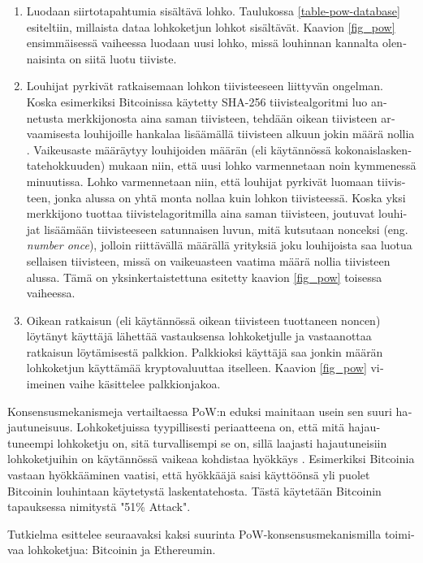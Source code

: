 \begin{otherlanguage}{english}
\begin{enumerate}
\item Luodaan siirtotapahtumia sisältävä lohko. Taulukossa \ref{table-pow-database} esiteltiin, millaista dataa lohkoketjun lohkot sisältävät. Kaavion \ref{fig_pow} ensimmäisessä vaiheessa luodaan uusi lohko, missä louhinnan kannalta olennaisinta on siitä luotu tiiviste.
\item Louhijat pyrkivät ratkaisemaan lohkon tiivisteeseen liittyvän ongelman. Koska esimerkiksi Bitcoinissa käytetty SHA-256 tiivistealgoritmi luo annetusta merkkijonosta aina saman tiivisteen, tehdään oikean tiivisteen arvaamisesta louhijoille hankalaa lisäämällä tiivisteen alkuun jokin määrä nollia \cite{blockchain1}. Vaikeusaste määräytyy louhijoiden määrän (eli käytännössä kokonaislaskentatehokkuuden) mukaan niin, että uusi lohko varmennetaan noin kymmenessä minuutissa. Lohko varmennetaan niin, että louhijat pyrkivät luomaan tiivisteen, jonka alussa on yhtä monta nollaa kuin lohkon tiivisteessä. Koska yksi merkkijono tuottaa tiivistelagoritmilla aina saman tiivisteen, joutuvat louhijat lisäämään tiivisteeseen satunnaisen luvun, mitä kutsutaan nonceksi (eng. \textit{number once}), jolloin riittävällä määrällä yrityksiä joku louhijoista saa luotua sellaisen tiivisteen, missä on vaikeuasteen vaatima määrä nollia tiivisteen alussa. Tämä on yksinkertaistettuna esitetty kaavion \ref{fig_pow} toisessa vaiheessa.
\item Oikean ratkaisun (eli käytännössä oikean tiivisteen tuottaneen noncen) löytänyt käyttäjä lähettää vastauksensa lohkoketjulle ja vastaanottaa ratkaisun löytämisestä palkkion. Palkkioksi käyttäjä saa jonkin määrän lohkoketjun käyttämää kryptovaluuttaa itselleen. Kaavion \ref{fig_pow} viimeinen vaihe käsittelee palkkionjakoa.
\end{enumerate}

Konsensusmekanismeja vertailtaessa PoW:n eduksi mainitaan usein sen suuri hajautuneisuus. Lohkoketjuissa tyypillisesti periaatteena on, että mitä hajautuneempi lohkoketju on, sitä turvallisempi se on, sillä laajasti hajautuneisiin lohkoketjuihin on käytännössä vaikeaa kohdistaa hyökkäys \cite{51attack}. Esimerkiksi Bitcoinia vastaan hyökkääminen vaatisi, että hyökkääjä saisi käyttöönsä yli puolet Bitcoinin louhintaan käytetystä laskentatehosta. Tästä käytetään Bitcoinin tapauksessa nimitystä "51\% Attack".


Tutkielma esittelee seuraavaksi kaksi suurinta PoW-konsensusmekanismilla toimivaa lohkoketjua: Bitcoinin ja Ethereumin.




\end{otherlanguage}